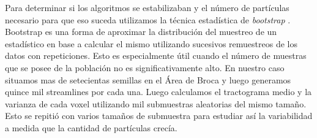 Para determinar si los algoritmos se estabilizaban y el n\'umero de part\'iculas
necesario para que eso suceda utilizamos la t\'ecnica estad\'istica de
\textit{bootstrap} \cite{Efron1982}. Bootstrap es una forma de aproximar la
distribuci\'on del muestreo de un estad\'istico en base a calcular el mismo
utilizando sucesivos remuestreos de los datos con repeticiones. Esto es
especialmente \'util cuando el n\'umero de muestras que se posee de la poblaci\'on
no es significativamente alto. En nuestro caso situamos mas de setecientas
semillas en el \'Area de Broca y luego generamos quince mil streamlines por cada
una. Luego calculamos el tractograma medio y la varianza de cada voxel utilizando
mil submuestras aleatorias del mismo tama\~no. Esto se repiti\'o con varios
tama\~nos de submuestra para estudiar as\'i la variabilidad a medida que la
cantidad de part\'iculas crec\'ia.\\
